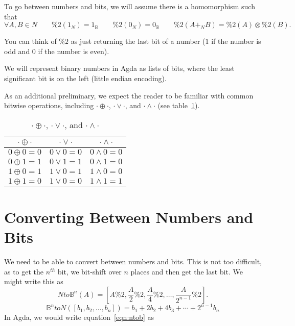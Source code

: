 \documentclass[14pt]{extarticle}  %
\theoremstyle{plain}
\theoremstyle{definition}
\theoremstyle{remark}
\begin{document}
To go between numbers and bits, we will assume there is a homomorphism
\rnc{}
such that
\[\forall A,B \in N \qquad \%2(1_{N}) = 1_{\mathbb{B}} \qquad \%2(0_{N}) = 0_{\mathbb{B}} \qquad \%2(A +_{N} B) = \%2(A) \otimes \%2(B).\]

You can think of $\%2$ as just returning the last bit of a number ($1$ if the number is odd and $0$ if the number is even).

We will represent binary numbers in Agda as lists of bits, where the least significant bit is on the left (little endian encoding).

As an additional preliminary, we expect the reader to be familiar with common bitwise operations, including $\cdot \oplus \cdot$, $\cdot \lor \cdot$, and $\cdot \land \cdot$ (see table~\ref{table:bitops}).
\begin{table}[h!]
\centering
\begin{tabular}{||c c c||}
 \hline
 $\cdot \oplus \cdot$ & $\cdot \lor \cdot$ & $\cdot \land \cdot$  \\ [0.5ex]
 \hline\hline
 $0 \oplus 0 = 0$ & $0 \lor 0 = 0$ & $0 \land 0 = 0$ \\
 $0 \oplus 1 = 1$ & $0 \lor 1 = 1$ & $0 \land 1 = 0$ \\
 $1 \oplus 0 = 1$ & $1 \lor 0 = 1$ & $1 \land 0 = 0$ \\
 $1 \oplus 1 = 0$ & $1 \lor 0 = 0$ & $1 \land 1 = 1$ \\
 \hline
\end{tabular}
\caption{$\cdot \oplus \cdot$, $\cdot \lor \cdot$, and $\cdot \land \cdot$}
\label{table:bitops}
\end{table}

\section{Converting Between Numbers and Bits}
We need to be able to convert between numbers and bits. This is not too difficult, as to get the $n^{th}$ bit, we bit-shift over $n$ places
and then get the last bit. We might write this as
\begin{equation}\label{eqn:ntob}
Nto\mathbb{B}^{n}(A) = [A \% 2 , \frac{A}{2} \% 2 , \frac{A}{4} \% 2 , \ldots, \frac{A}{2^{n-1}} \%2 ].
\end{equation}
\begin{equation}\label{eqn:bton}
  \mathbb{B}^{n}toN([b_{1}, b_{2}, \ldots, b_{n}]) = b_{1} + 2b_{2}+4b_{3}+\cdots+2^{n-1}b_{n}
\end{equation}
\rnc{}
In Agda, we would write equation~\ref{eqn:ntob} as 
\end{document}
